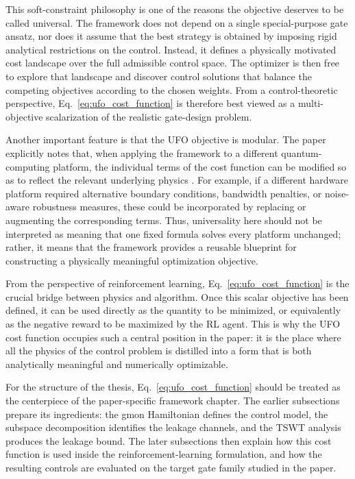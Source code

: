This soft-constraint philosophy is one of the reasons the objective deserves to be called universal. The framework does not depend on a single special-purpose gate ansatz, nor does it assume that the best strategy is obtained by imposing rigid analytical restrictions on the control. Instead, it defines a physically motivated cost landscape over the full admissible control space. The optimizer is then free to explore that landscape and discover control solutions that balance the competing objectives according to the chosen weights. From a control-theoretic perspective, Eq.~\eqref{eq:ufo_cost_function} is therefore best viewed as a multi-objective scalarization of the realistic gate-design problem.

Another important feature is that the UFO objective is modular. The paper explicitly notes that, when applying the framework to a different quantum-computing platform, the individual terms of the cost function can be modified so as to reflect the relevant underlying physics \cite{Niu2019}. For example, if a different hardware platform required alternative boundary conditions, bandwidth penalties, or noise-aware robustness measures, these could be incorporated by replacing or augmenting the corresponding terms. Thus, universality here should not be interpreted as meaning that one fixed formula solves every platform unchanged; rather, it means that the framework provides a reusable blueprint for constructing a physically meaningful optimization objective.

From the perspective of reinforcement learning, Eq.~\eqref{eq:ufo_cost_function} is the crucial bridge between physics and algorithm. Once this scalar objective has been defined, it can be used directly as the quantity to be minimized, or equivalently as the negative reward to be maximized by the RL agent. This is why the UFO cost function occupies such a central position in the paper: it is the place where all the physics of the control problem is distilled into a form that is both analytically meaningful and numerically optimizable.

For the structure of the thesis, Eq.~\eqref{eq:ufo_cost_function} should be treated as the centerpiece of the paper-specific framework chapter. The earlier subsections prepare its ingredients: the gmon Hamiltonian defines the control model, the subspace decomposition identifies the leakage channels, and the TSWT analysis produces the leakage bound. The later subsections then explain how this cost function is used inside the reinforcement-learning formulation, and how the resulting controls are evaluated on the target gate family studied in the paper.



